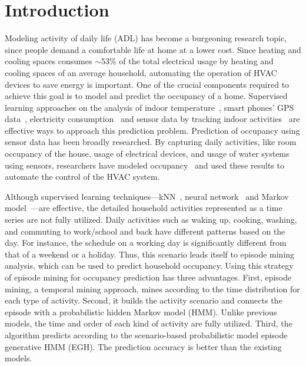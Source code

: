 \section{Introduction}

Modeling activity of daily life (ADL) has become a burgeoning research topic, 
since people demand a comfortable life at home
at a lower cost. 
Since heating and cooling spaces consumes $\sim$53\% of the total electrical usage 
by heating and cooling spaces %
of an average household, 
automating the operation of HVAC devices to save energy is important. 
One of the crucial components required to achieve this goal is 
to model and predict the occupancy of a home. 
Supervised learning approaches on the analysis of indoor temperature~\cite{kleiminger2014predicting}, 
smart phones' GPS data~\cite{koehler2013therml}, 
electricity consumption~\cite{erickson2010occupancy} and 
sensor data by tracking indoor activities~\cite{scott2011preheat,alrazgan2011learning} 
are effective ways to approach this prediction problem. 
Prediction of occupancy using sensor data has been broadly researched. 
By capturing daily activities, like room occupancy of the house, 
usage of electrical devices, 
and usage of water systems using sensors, 
researchers have modeled occupancy~\cite{mahmoud2013behavioural,erickson2010occupancy,beltran2014optimal} 
and used these results to automate the control of the HVAC system. 

Although supervised learning techniques---kNN~\cite{scott2011preheat}, 
neural network~\cite{mahmoud2013behavioural} and Markov model~\cite{erickson2010occupancy}---are effective, 
the detailed household activities represented as a time series are not fully utilized. 
Daily activities such as waking up, cooking, washing, and commuting to work/school and back 
have different patterns based on the day. 
For instance, the schedule on a working day is significantly different from that of a weekend 
or a holiday. 
Thus, this scenario leads itself to episode mining analysis, 
which can be used to predict household occupancy. 
Using this strategy of episode mining for occupancy prediction has three advantages. 
First, episode mining, a temporal mining approach, mines according to the time 
distribution for each type of activity. 
Second, it builds the activity scenario and connects the episode with 
a probabilistic hidden Markov model (HMM). 
Unlike previous models, 
the time and order of each kind of activity are fully utilized. 
Third, the algorithm predicts according to the scenario-based probabilistic model episode 
generative HMM (EGH). The prediction accuracy is better than the existing models. 

